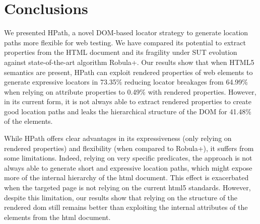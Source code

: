 \section{Conclusions}

We presented HPath, a novel DOM-based locator strategy to generate location paths more flexible for web testing. We have compared its potential to extract properties from the HTML document and its fragility under SUT evolution against state-of-the-art algorithm Robula+. Our results show that when HTML5 semantics are present, HPath can exploit rendered properties of web elements to generate expressive locators in 73.35\% reducing locator breakages from 64.99\% when relying on attribute properties to 0.49\% with rendered properties. However, in its current form, it is not always able to extract rendered properties to create good location paths and leaks the hierarchical structure of the DOM for 41.48\% of the elements.

While HPath offers clear advantages in its expressiveness (only relying on rendered properties) and flexibility (when compared to Robula+), it suffers from some limitations. Indeed, relying on very specific predicates, the approach is not always able to generate short and expressive location paths, which might expose more of the internal hierarchy of the \gls{html} document. This effect is exacerbated when the targeted page is not relying on the current \gls{html}5 standards. However, despite this limitation, our results show that relying on the structure of the rendered \gls{dom} still remains better than exploiting the internal attributes of the elements from the \gls{html} document.